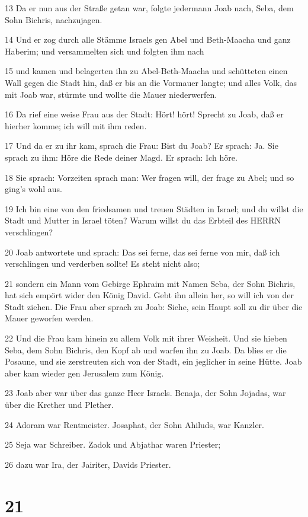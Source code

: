 \par 13 Da er nun aus der Straße getan war, folgte jedermann Joab nach, Seba, dem Sohn Bichris, nachzujagen.
\par 14 Und er zog durch alle Stämme Israels gen Abel und Beth-Maacha und ganz Haberim; und versammelten sich und folgten ihm nach
\par 15 und kamen und belagerten ihn zu Abel-Beth-Maacha und schütteten einen Wall gegen die Stadt hin, daß er bis an die Vormauer langte; und alles Volk, das mit Joab war, stürmte und wollte die Mauer niederwerfen.
\par 16 Da rief eine weise Frau aus der Stadt: Hört! hört! Sprecht zu Joab, daß er hierher komme; ich will mit ihm reden.
\par 17 Und da er zu ihr kam, sprach die Frau: Bist du Joab? Er sprach: Ja. Sie sprach zu ihm: Höre die Rede deiner Magd. Er sprach: Ich höre.
\par 18 Sie sprach: Vorzeiten sprach man: Wer fragen will, der frage zu Abel; und so ging's wohl aus.
\par 19 Ich bin eine von den friedsamen und treuen Städten in Israel; und du willst die Stadt und Mutter in Israel töten? Warum willst du das Erbteil des HERRN verschlingen?
\par 20 Joab antwortete und sprach: Das sei ferne, das sei ferne von mir, daß ich verschlingen und verderben sollte! Es steht nicht also;
\par 21 sondern ein Mann vom Gebirge Ephraim mit Namen Seba, der Sohn Bichris, hat sich empört wider den König David. Gebt ihn allein her, so will ich von der Stadt ziehen. Die Frau aber sprach zu Joab: Siehe, sein Haupt soll zu dir über die Mauer geworfen werden.
\par 22 Und die Frau kam hinein zu allem Volk mit ihrer Weisheit. Und sie hieben Seba, dem Sohn Bichris, den Kopf ab und warfen ihn zu Joab. Da blies er die Posaune, und sie zerstreuten sich von der Stadt, ein jeglicher in seine Hütte. Joab aber kam wieder gen Jerusalem zum König.
\par 23 Joab aber war über das ganze Heer Israels. Benaja, der Sohn Jojadas, war über die Krether und Plether.
\par 24 Adoram war Rentmeister. Josaphat, der Sohn Ahiluds, war Kanzler.
\par 25 Seja war Schreiber. Zadok und Abjathar waren Priester;
\par 26 dazu war Ira, der Jairiter, Davids Priester.

\chapter{21}

